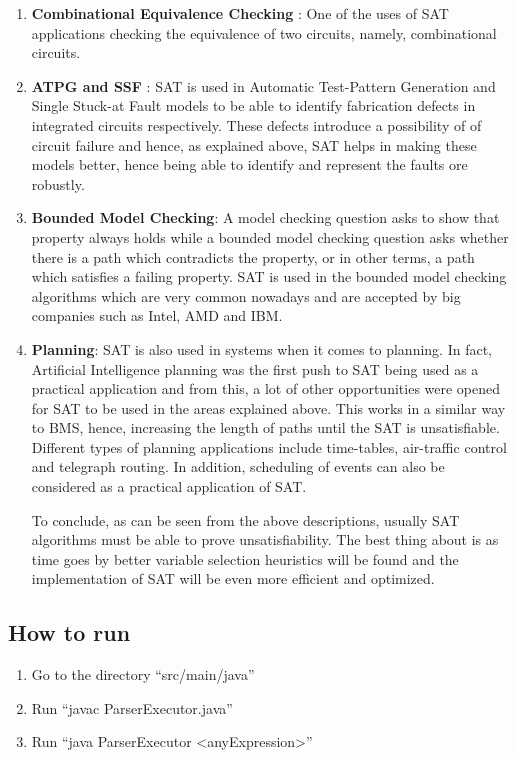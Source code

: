 \documentclass{article}
\newcommand{\quotes}[1]{``#1''}
\begin{document}
\begin{enumerate}
\item \textbf{Combinational Equivalence Checking} : One of the uses of SAT applications checking the equivalence of two circuits, namely, combinational circuits\cite{pa3}. 
\item \textbf{ATPG and SSF} : SAT is used in Automatic Test-Pattern Generation and Single Stuck-at Fault models to be able to identify  fabrication defects in integrated circuits respectively\cite{pa3}. These defects introduce a possibility of of circuit failure and hence, as explained above, SAT helps in making these models better, hence being able to identify and represent the faults ore robustly.
\item \textbf{Bounded Model Checking}: A model checking question asks to show that property always holds while a bounded model checking question asks whether there is a path which contradicts the property, or in other terms, a path which satisfies a failing property. SAT is used in the bounded model checking algorithms which are very common nowadays and are accepted by big companies such as Intel, AMD and IBM\cite{pa1}.
\item \textbf{Planning}: SAT is also used in systems when it comes to planning. In fact, Artificial Intelligence planning was the first push to SAT being used as a practical application\cite{pa3} and from this, a lot of other opportunities were opened for SAT to be used in the areas explained above. This works in a similar way to BMS, hence, increasing the length of paths until the SAT is unsatisfiable. Different types of planning applications include time-tables, air-traffic control and telegraph routing\cite{pa1}. In addition, scheduling of events can also be considered as a practical application of SAT.

	To conclude, as can be seen from the above descriptions, usually SAT algorithms must be able to prove unsatisfiability. The best thing about is as time goes by better variable selection heuristics will be found and the implementation of SAT will be even more efficient and optimized. 

\end{enumerate}

\subsection{How to run}

\begin{enumerate}
\item Go to the directory \quotes{src/main/java}
\item Run \quotes{javac ParserExecutor.java}
\item Run \quotes{java ParserExecutor \textless anyExpression\textgreater}
\end{enumerate}
			
			
		
		\nocite{*}

			
		
			
					
			
\end{document}
